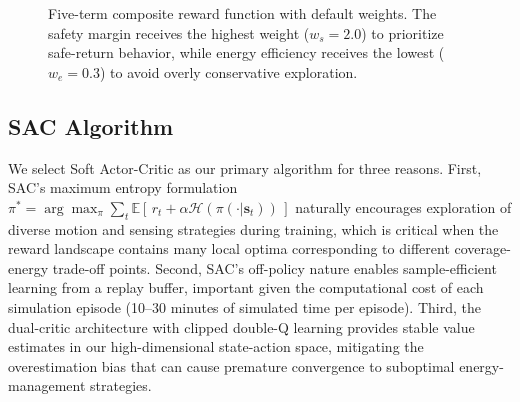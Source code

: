 \documentclass[conference]{IEEEtran}
\begin{document}
\begin{figure}[t]
\centering
{}
\caption{Five-term composite reward function with default weights. The safety margin receives the highest weight ($w_s=2.0$) to prioritize safe-return behavior, while energy efficiency receives the lowest ($w_e=0.3$) to avoid overly conservative exploration.}
\label{fig:reward}
\end{figure}


\subsection{SAC Algorithm}

We select Soft Actor-Critic \cite{Haarnoja2018SAC} as our primary algorithm for three reasons. First, SAC's maximum entropy formulation $\pi^* = \arg\max_\pi \sum_t \mathbb{E}[\,r_t + \alpha \mathcal{H}(\pi(\cdot | \boldsymbol{s}_t))\,]$ naturally encourages exploration of diverse motion and sensing strategies during training, which is critical when the reward landscape contains many local optima corresponding to different coverage-energy trade-off points. Second, SAC's off-policy nature enables sample-efficient learning from a replay buffer, important given the computational cost of each simulation episode (10--30 minutes of simulated time per episode). Third, the dual-critic architecture with clipped double-Q learning \cite{Fujimoto2018TD3} provides stable value estimates in our high-dimensional state-action space, mitigating the overestimation bias that can cause premature convergence to suboptimal energy-management strategies.
\end{document}
